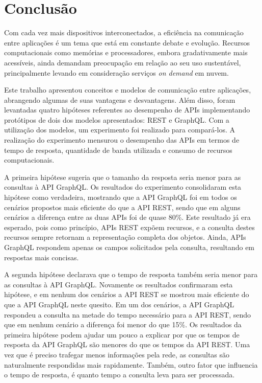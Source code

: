 \chapter{Conclusão}

Com cada vez mais dispositivos interconectados, a eficiência na comunicação entre aplicações é um tema que está em constante debate e evolução. Recursos computacionais como memórias e processadores, embora gradativamente mais acessíveis, ainda demandam preocupação em relação ao seu uso sustentável, principalmente levando em consideração serviços \textit{on demand} em nuvem.

Este trabalho apresentou conceitos e modelos de comunicação entre aplicações, abrangendo algumas de suas vantagens e desvantagens. Além disso, foram levantadas quatro hipóteses referentes ao desempenho de APIs implementando protótipos de dois dos modelos apresentados: REST e GraphQL. Com a utilização dos modelos, um experimento foi realizado para compará-los. A realização do experimento mensurou o desempenho das APIs em termos de tempo de resposta, quantidade de banda utilizada e consumo de recursos computacionais.

A primeira hipótese sugeria que o tamanho da resposta seria menor para as consultas à API GraphQL. Os resultados do experimento consolidaram esta hipótese como verdadeira, mostrando que a API GraphQL foi em todos os cenários propostos mais eficiente do que a API REST, sendo que em alguns cenários a diferença entre as duas APIs foi de quase 80\%. Este resultado já era esperado, pois como princípio, APIs REST expõem recursos, e a consulta destes recursos sempre retornam a representação completa dos objetos. Ainda, APIs GraphQL respondem apenas os campos solicitados pela consulta, resultando em respostas mais concisas.

A segunda hipótese declarava que o tempo de resposta também seria menor para as consultas à API GraphQL. Novamente os resultados confirmaram esta hipótese, e em nenhum dos cenários a API REST se mostrou mais eficiente do que a API GraphQL neste quesito. Em um dos cenários, a API GraphQL respondeu a consulta na metade do tempo necessário para a API REST, sendo que em nenhum cenário a diferença foi menor do que 15\%. Os resultados da primeira hipótese podem ajudar um pouco a explicar por que os tempos de resposta da API GraphQL são menores do que os tempos da API REST. Uma vez que é preciso trafegar menos informações pela rede, as consultas são naturalmente respondidas mais rapidamente. Também, outro fator que influencia o tempo de resposta, é quanto tempo a consulta leva para ser processada.

